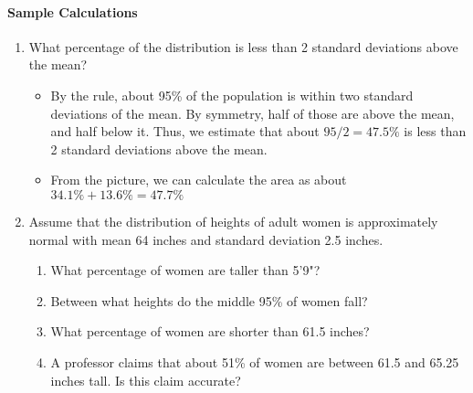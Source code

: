 \documentclass[10pt]{article}\usepackage[]{graphicx}\usepackage[]{color}
\begin{document}
\paragraph{Sample Calculations}
\begin{enumerate}
	\item What percentage of the distribution is less than 2 standard deviations above the mean?
	\begin{itemize}
		\item By the rule, about 95\% of the population is within two standard deviations of the mean. By symmetry, half
of those are above the mean, and half below it. Thus, we estimate that about $95/2 = 47.5\%$ is less than 2
standard deviations above the mean.
		\item From the picture, we can calculate the area as about $34.1\% + 13.6\% = 47.7\%$
	\end{itemize}
	\item Assume that the distribution of heights of adult women is approximately normal with mean 64 inches and standard
deviation 2.5 inches.
	\begin{enumerate}
    \itemsep0.5in
		\item What percentage of women are taller than 5'9"?
		

		\item Between what heights do the middle 95\% of women fall?

		
		
		\item What percentage of women are shorter than 61.5 inches?

    \item A professor claims that about 51\% of women are between 61.5 and 65.25 inches tall. Is this claim accurate?
	\end{enumerate}
\end{enumerate}
\end{document}

